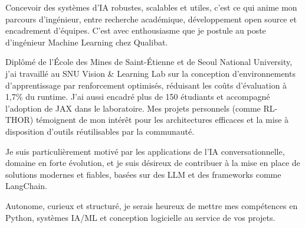 
\newcommand{\Company}{Qualibat}
\recipient{\RecruitmentTeam{\Company}}{\Company\\Paris\\ France}
\date{}
\makelettertitle{}
Concevoir des systèmes d'IA robustes, scalables et utiles, c'est ce qui anime mon parcours d'ingénieur, entre recherche académique, développement open source et encadrement d'équipes. C'est avec enthousiasme que je postule au poste d'ingénieur Machine Learning chez Qualibat.

Diplômé de l'École des Mines de Saint-Étienne et de Seoul National University, j'ai travaillé au SNU Vision & Learning Lab sur la conception d'environnements d'apprentissage par renforcement optimisés, réduisant les coûts d'évaluation à 1,7\% du runtime. J'ai aussi encadré plus de 150 étudiants et accompagné l'adoption de JAX dans le laboratoire. Mes projets personnels (comme RL-THOR) témoignent de mon intérêt pour les architectures efficaces et la mise à disposition d'outils réutilisables par la communauté.

Je suis particulièrement motivé par les applications de l'IA conversationnelle, domaine en forte évolution, et je suis désireux de contribuer à la mise en place de solutions modernes et fiables, basées sur des LLM et des frameworks comme LangChain.

Autonome, curieux et structuré, je serais heureux de mettre mes compétences en Python, systèmes IA/ML et conception logicielle au service de vos projets.

\makeletterclosing
